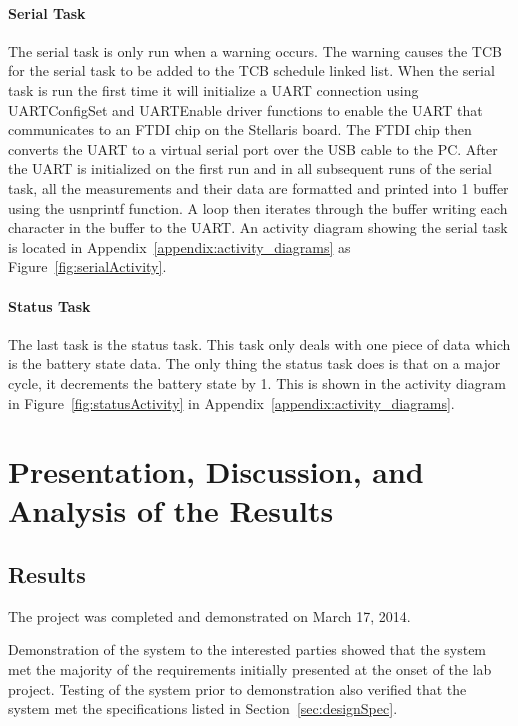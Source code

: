 \documentclass[12pt]{article} %
\begin{document}
    \paragraph{Serial Task} The serial task is only run when a warning occurs.
    The warning causes the TCB for the serial task to be added to the TCB
    schedule linked list. When the serial task is run the first time it will
    initialize a UART connection using UARTConfigSet and UARTEnable driver
    functions to enable the UART that communicates to an FTDI chip on the
    Stellaris board. The FTDI chip then converts the UART to a virtual serial
    port over the USB cable to the PC. After the UART is initialized on the
    first run and in all subsequent runs of the serial task, all the
    measurements and their data are formatted and printed into 1 buffer using
    the usnprintf function. A loop then iterates through the buffer writing
    each character in the buffer to the UART. An activity diagram showing the
		serial task is located in Appendix~\ref{appendix:activity_diagrams} as Figure~\ref{fig:serialActivity}.
    
    \paragraph{Status Task}
    The last task is the status task. This task only deals with one piece of data
    which is the battery state data. The only thing the status task does is that on
    a major cycle, it decrements the battery state by 1. This is shown in the
		activity diagram in Figure~\ref{fig:statusActivity} in Appendix~\ref{appendix:activity_diagrams}.

    \section{Presentation, Discussion, and Analysis of the Results}

    \subsection{Results} 
    The project was completed and demonstrated on March 17, 2014.

    Demonstration of the system to the interested parties showed that the
    system met the majority of the requirements initially presented at the onset of the lab
    project.  Testing of the system prior to demonstration also verified that
    the system met the specifications listed in Section~\ref{sec:designSpec}.
\end{document}
